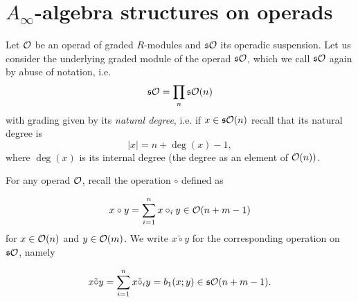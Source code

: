 \documentclass[join.tex]{subfiles}
\begin{document}
%





\section{$A_\infty$-algebra structures on operads}\label{sect2}


Let ${\mathcal O}$ be an operad of graded $R$-modules and $\mathfrak{s}{\mathcal O}$ its operadic suspension. Let us consider the underlying graded module of the operad $\mathfrak{s}{\mathcal O}$, which we  call $\mathfrak{s}{\mathcal O}$ again by abuse of notation, i.e. \[\mathfrak{s}{\mathcal O}=\prod_n \mathfrak{s}{\mathcal O}(n)\] with grading given by its \emph{natural degree}, i.e. if $x\in \mathfrak{s}{\mathcal O}(n)$ recall that its natural degree is \[|x|=n+\deg(x)-1,\] where $\deg(x)$ is its internal degree (the degree as an element of ${\mathcal O}(n))$. 

For any operad ${\mathcal O}$, recall the operation $\circ$ defined as

\[
x\circ y=\sum_{i=1}^n x\circ_i y\in{\mathcal O}(n+m-1)
\]
for $x\in{\mathcal O}(n)$ and $y\in {\mathcal O}(m)$. We write $x\tilde{\circ}y$ for the corresponding operation on $\mathfrak{s}{\mathcal O}$, namely

\[
x\tilde{\circ} y=\sum_{i=1}^n x\tilde{\circ}_i y=b_1(x;y)\in\mathfrak{s}{\mathcal O}(n+m-1).
\]
\end{document}

